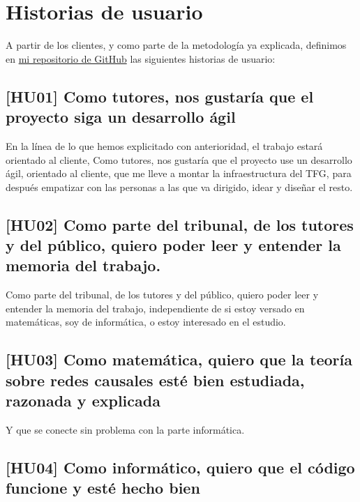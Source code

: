 \section{Historias de usuario}  

A partir de los clientes, y como parte de la metodología ya explicada, definimos en \href{https://github.com/ElenaMerelo/TFG}{mi repositorio 
de GitHub} las siguientes historias de usuario: 

\subsection{[HU01] Como tutores, nos gustaría que el proyecto siga un desarrollo ágil}

En la línea de lo que hemos explicitado con anterioridad, el trabajo estará orientado 
al cliente, 
Como tutores, nos gustaría que el proyecto use un desarrollo ágil, orientado al cliente, 
que me lleve a montar la infraestructura del TFG, para después empatizar con las personas 
a las que va dirigido, idear y diseñar el resto.

\subsection{[HU02] Como parte del tribunal, de los tutores y del público, quiero 
poder leer y entender la memoria del trabajo.}
Como parte del tribunal, de los tutores y del público, quiero poder leer y entender 
la memoria del trabajo, independiente de si estoy versado en matemáticas, soy de 
informática, o estoy interesado en el estudio.

\subsection*{[HU03] Como matemática, quiero que la teoría sobre redes causales esté 
bien estudiada, razonada y explicada}

Y que se conecte sin problema con la parte informática.

\subsection*{[HU04] Como informático, quiero que el código funcione y esté hecho bien}
